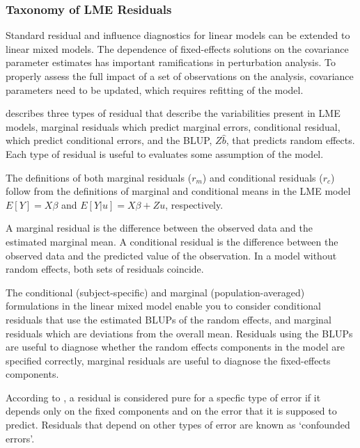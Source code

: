 \documentclass[12pt, a4paper]{report}
\theoremstyle{definition}
\theoremstyle{remark}
\begin{document}
\subsubsection{Taxonomy of LME Residuals}
Standard residual and influence diagnostics for linear models can
be extended to linear mixed models. The dependence of
fixed-effects solutions on the covariance parameter estimates has
important ramifications in perturbation analysis. To properly assess the
full impact of a set of observations on the analysis, covariance
parameters need to be updated, which requires refitting of the
model.

\citet{PB} describes three types of residual that describe the variabilities
present in LME models, marginal residuals which predict marginal errors, conditional residual, which predict conditional errors, and the BLUP, $ {Z\hat{b}}$, that predicts random effects.
Each type of residual is useful to evaluates some assumption of the model.

The definitions of both marginal residuals ($r_m$) and conditional residuals ($r_c$) follow from the definitions of marginal and conditional means in the LME model 
$E[{Y}] = {X}{\beta}$ and $E[{Y|{u}}] = {X}{\beta} + {Z}{u}$, respectively.

A marginal residual is the difference between the observed data and the estimated marginal mean. A conditional residual is the difference between the observed data and the predicted value of the observation. In a model without random effects, both sets of residuals coincide.


The conditional (subject-specific) and marginal (population-averaged) formulations in the linear mixed model enable you to consider conditional residuals that use the estimated BLUPs of the random effects, and marginal residuals which are deviations from the overall mean. Residuals using the BLUPs are useful to diagnose whether the random effects components in the model are specified correctly, marginal residuals are useful to diagnose the fixed-effects components.


According to \citet{hilden1995}, a residual is considered pure for a specfic type of error if it depends only on the fixed components and on the error that it is supposed to predict. Residuals that depend on other types of error are known as `confounded errors'.
\end{document}
